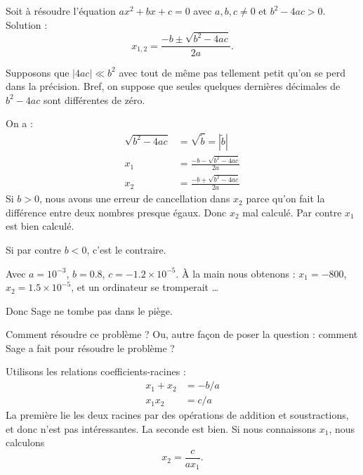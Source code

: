 \begin{example}
	Soit à résoudre l'équation \( ax^2+bx+c=0\) avec \( a,b,c\neq 0\) et \( b^2-4ac>0\). Solution :
	\begin{equation}
		x_{1,2}=\frac{ -b\pm\sqrt{b^2-4ac} }{ 2a }.
	\end{equation}

	Supposons que \( | 4ac |\ll b^2\) avec tout de même pas tellement petit qu'on se perd dans la précision. Bref, on suppose que seules quelques dernières décimales de \( b^2-4ac\) sont différentes de zéro.

	On a :
	\begin{subequations}
		\begin{align}
			\sqrt{b^2-4ac}&=\sqrt{\tilde b}= | \tilde b | \\
			x_1&=\frac{ -b-\sqrt{b^2-4ac} }{ 2a }\\
			x_2&=\frac{ -b+\sqrt{b^2-4ac} }{ 2a }
		\end{align}
	\end{subequations}
	Si \( b>0\), nous avons une erreur de cancellation dans \( x_2\) parce qu'on fait la différence entre deux nombres presque égaux. Donc \( x_2\) mal calculé. Par contre \( x_1\) est bien calculé.


	Si par contre \( b<0\), c'est le contraire.


	Avec \( a=10^{-3}\), \( b=0.8\), \( c=-1.2\times 10^{-5}\). À la main nous obtenons : \( x_1=-800\), \( x_2=1.5\times 10^{-5}\), et un ordinateur se tromperait \ldots




	Donc Sage ne tombe pas dans le piège.
\end{example}

Comment résoudre ce problème ? Ou, autre façon de poser la question : comment Sage a fait pour résoudre le problème ?

Utilisons les relations coefficients-racines :
\begin{subequations}
	\begin{align}
		x_1+x_2&=-b/a\\
		x_1x_2&=c/a
	\end{align}
\end{subequations}
La première lie les deux racines par des opérations de addition et soustractions, et donc n'est pas intéressantes. La seconde est bien. Si nous connaissons \( x_1\), nous calculons
\begin{equation}
	x_2=\frac{ c }{ ax_1 }.
\end{equation}

